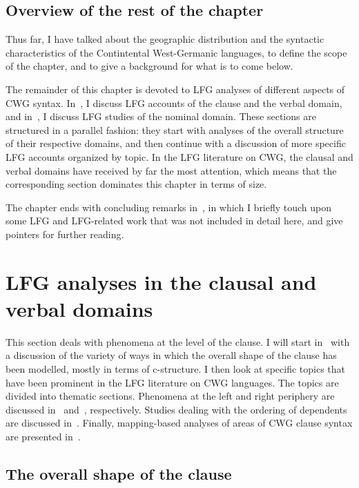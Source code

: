 \documentclass[output=paper,hidelinks]{langscibook}
\begin{document}
\subsection{Overview of the rest of the chapter}

Thus far, I have talked about the geographic distribution and the
syntactic characteristics of the Contintental West-Germanic languages,
to define the scope of the chapter, and to give a background for what
is to come below.

The remainder of this chapter is devoted to LFG analyses of different
aspects of CWG syntax. In~, I discuss LFG
accounts of the clause and the verbal domain, and
in~, I discuss LFG studies of the nominal
domain. These sections are structured in a parallel fashion: they
start with analyses of the overall structure of their respective
domains, and then continue with a discussion of more specific LFG
accounts organized by topic. In the LFG literature on CWG, the clausal
and verbal domains have received by far the most attention, which
means that the corresponding section dominates this chapter in terms
of size.

The chapter ends with concluding remarks in~,
in which I briefly touch upon some LFG and LFG-related work that was not
included in detail here, and give pointers for further reading.

\section{LFG analyses in the clausal and verbal domains\label{sec:Germanic:clausverb}}

This section deals with phenomena at the level of the clause. I will
start in~ with a discussion of the variety of
ways in which the overall shape of the clause has been modelled, mostly in
terms of c-structure. I then look at specific topics that have been
prominent in the LFG literature on CWG languages. The topics are
divided into thematic sections. Phenomena at the left and right
periphery are discussed in~
and~, respectively. Studies dealing with the
ordering of dependents are discussed
in~. Finally, mapping-based analyses of areas of
CWG clause syntax are presented in~.


\subsection{The overall shape of the clause\label{sec:Germanic:overall}}
\end{document}
